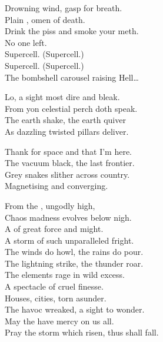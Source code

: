 Drowning wind, gasp for breath. \\
Plain , omen of death. \\
Drink the piss and smoke your meth. \\
No one left. \\

Supercell. (Supercell.) \\
Supercell. (Supercell.) \\
The bombshell carousel raising Hell… \\




Lo, a sight most dire and bleak. \\
From yon celestial perch doth speak. \\
The earth shake, the earth quiver \\
As dazzling twisted pillars deliver. \\


Thank  for space and that I'm here. \\
The vacuum black, the last frontier. \\
Grey snakes slither across country. \\
Magnetising and converging. \\


From the , ungodly high, \\
Chaos madness evolves below nigh. \\
A  of great force and might. \\
A storm of such unparalleled fright. \\
The winds do howl, the rains do pour. \\
The lightning strike, the thunder roar. \\

The elements rage in wild excess. \\
A spectacle of cruel finesse. \\
Houses, cities, torn asunder. \\
The havoc wreaked, a sight to wonder. \\
May the  have mercy on us all. \\
Pray the storm which risen, thus shall fall. \\

